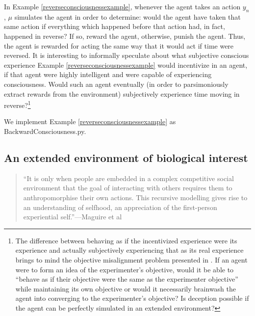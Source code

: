 \documentclass{article}
\begin{document}
In Example \ref{reverseconsciousnessexample}, whenever the agent takes an action $y_n$,
$\mu$ simulates the agent in order to determine: would the agent have taken that same
action if everything which happened before that action had, in fact, happened in reverse?
If so, reward the agent, otherwise, punish the agent.
Thus, the agent is rewarded for acting the same way that it would act if time were
reversed. It is interesting to informally speculate about what subjective conscious
experience Example \ref{reverseconsciousnessexample} would incentivize in an agent,
if that agent were highly intelligent and were capable of experiencing consciousness.
Would such an agent eventually (in order to parsimoniously extract rewards from the
environment) subjectively experience time moving in reverse?\footnote{The
difference between behaving as if
the incentivized experience were its experience and actually subjectively
experiencing that as its real experience brings to mind the objective misalignment
problem presented in \cite{hubinger2019risks}. If an agent were to form an
idea of the experimenter's objective, would it be able to ``behave as if
their objective were the same as the experimenter objective'' while maintaining its own
objective or would it necessarily brainwash the agent into converging to the
experimenter's objective? Is deception possible if the agent can be perfectly
simulated in an extended environment?}

We implement Example \ref{reverseconsciousnessexample} as BackwardConsciousness.py.

\subsection{An extended environment of biological interest}

\begin{quote}
``It  is  only  when  people  are  embedded  in  a  complex  competitive  social
environment  that  the  goal  of  interacting  with  others  requires  them
to  anthropomorphise  their  own  actions. This recursive modelling gives rise to
an understanding of selfhood, an appreciation of the first-person experiential
self.''---Maguire et al \cite{maguire2016understanding}
\end{quote}
\end{document}
